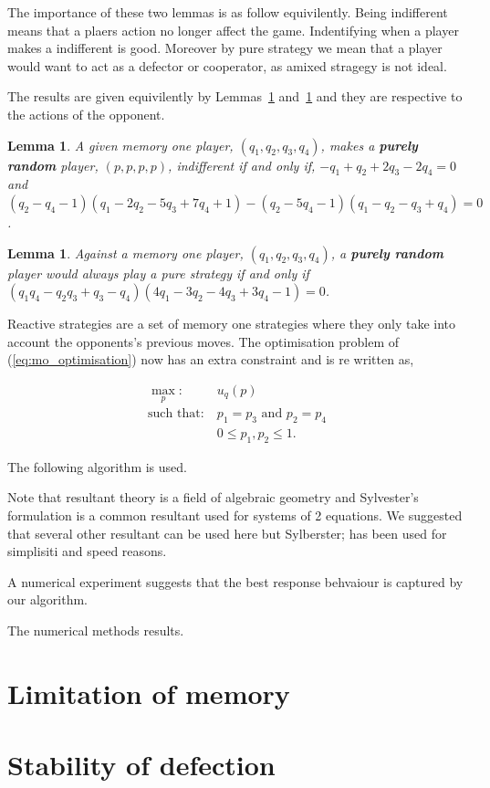 \documentclass[10pt]{article}
\newtheorem{lemma}[theorem]{Lemma}
\begin{document}
The importance of these two lemmas is as follow equivilently. Being indifferent
means that a plaers action no longer affect the game. Indentifying when a player
makes a indifferent is good. Moreover by pure strategy we mean that a player
would want to act as a defector or cooperator, as amixed stragegy is not ideal.

The results are given equivilently by Lemmas~\ref{lemma:constant} and~\ref{lemma:linear}
and they are respective to the actions of the opponent.

\begin{lemma}\label{lemma:constant}
    A given memory one player, \((q_1, q_2, q_3, q_4)\), makes a \textbf{purely
    random} player, \((p, p, p, p)\), indifferent if and only if, 
    \(-q_1 + q_2 + 2q_3 - 2q_4 = 0 \) and 
    \((q_2 - q_4 - 1)(q_1 - 2q_2 - 5q_3 + 7q_4 + 1) -(q_2 - 5q_4 - 1)(q_1 - q_2 - q_3 + q_4) = 0 \).
\end{lemma}

\begin{lemma}\label{lemma:linear}
    Against a memory one player, \((q_1, q_2, q_3, q_4)\), a \textbf{purely random}
    player would always play a pure strategy if and only if
    \((q_{1}q_{4} - q_{2} q_{3} + q_{3} - q_{4}) (4 q_{1} - 3 q_{2} - 4 q_{3} + 3 
    q_{4} - 1) = 0\).
\end{lemma}

Reactive strategies are a set of memory one strategies where they only take into
account the opponents's previous moves. The optimisation problem of (\ref{eq:mo_optimisation})
now has an extra constraint and is re written as,

\begin{equation}\label{eq:random_optimisation}
\begin{aligned}
\max_p: & \ u_q(p)
\\
\text{such that}: & \ p_1 = p_3 \text{ and } p_2 = p_4\\
    & \ 0 \leq p_1, p_2 \leq 1.
\end{aligned}
\end{equation}

The following algorithm is used.

Note that resultant theory is a field of algebraic geometry and Sylvester's formulation
is a common resultant used for systems of 2 equations.
We suggested that several other resultant can be used here but Sylberster; has been used for simplisiti and 
speed reasons.

A numerical experiment suggests that the best response behvaiour is captured by our algorithm.

The numerical methods
results.

\section{Limitation of memory}

\section{Stability of defection}



\end{document}
